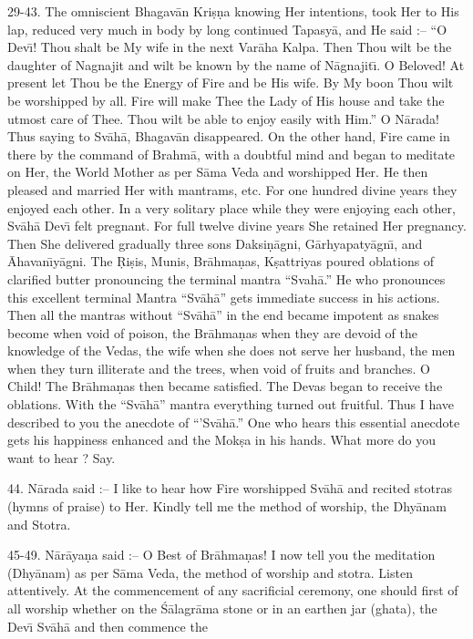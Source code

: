 29-43. The omniscient Bhagav\=an Kri\d{s}\d{n}a knowing Her intentions, took Her to His lap, reduced very much in body by long continued Tapasy\=a, and He said :-- ``O Dev\={\i}! Thou shalt be My wife in the next Var\=aha Kalpa. Then Thou wilt be the daughter of Nagnajit and wilt be known by the name of N\=agnajit\={\i}. O Beloved! At present let Thou be the Energy of Fire and be His wife. By My boon Thou wilt be worshipped by all. Fire will make Thee the Lady of His house and take the utmost care of Thee. Thou wilt be able to enjoy easily with Him.'' O N\=arada! Thus saying to Sv\=ah\=a, Bhagav\=an disappeared. On the other hand, Fire came in there by the command of Brahm\=a, with a doubtful mind and began to meditate on Her, the World Mother as per S\=ama Veda and worshipped Her. He then pleased and married Her with mantrams, etc. For one hundred divine years they enjoyed each other. In a very solitary place while they were enjoying each other, Sv\=ah\=a Dev\={\i} felt pregnant. For full twelve divine years She retained Her pregnancy. Then She delivered gradually three sons Daksi\d{n}\=agni, G\=arhyapaty\=agn\={\i}, and \=Ahavan\={\i}y\=agni. The \d{R}i\d{s}is, Munis, Br\=ahma\d{n}as, K\d{s}attriyas poured oblations of clarified butter pronouncing the terminal mantra ``Svah\=a.'' He who pronounces this excellent terminal Mantra ``Sv\=ah\=a'' gets immediate success in his actions. Then all the mantras without ``Sv\=ah\=a'' in the end became impotent as snakes become when void of poison, the Br\=ahma\d{n}as when they are devoid of the knowledge of the Vedas, the wife when she does not serve her husband, the men when they turn illiterate and the trees, when void of fruits and branches. O Child! The Br\=ahma\d{n}as then became satisfied. The Devas began to receive the oblations. With the ``Sv\=ah\=a'' mantra everything turned out fruitful. Thus I have described to you the anecdote of ``'Sv\=ah\=a.'' One who hears this essential anecdote gets his happiness enhanced and the Mok\d{s}a in his hands. What more do you want to hear ? Say.

44. N\=arada said :-- I like to hear how Fire worshipped Sv\=ah\=a and recited stotras (hymns of praise) to Her. Kindly tell me the method of worship, the Dhy\=anam and Stotra.

45-49. N\=ar\=aya\d{n}a said :-- O Best of Br\=ahma\d{n}as! I now tell you the meditation (Dhy\=anam) as per S\=ama Veda, the method of worship and stotra. Listen attentively. At the commencement of any sacrificial ceremony, one should first of all worship whether on the \'S\=alagr\=ama stone or in an earthen jar (ghata), the Dev\={\i} Sv\=ah\=a and then commence the

